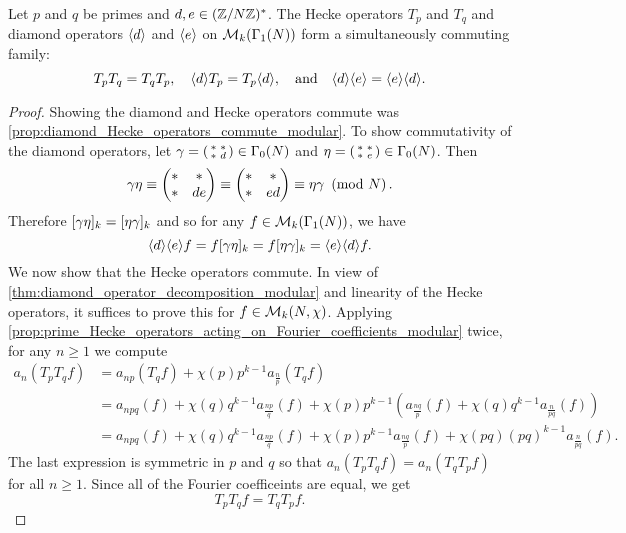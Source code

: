       \begin{proposition}\label{prop:Hecke_operators_commute_modular}
        Let $p$ and $q$ be primes and $d,e \in (\mathbb{Z}/N\mathbb{Z})^{\ast}$. The Hecke operators $T_{p}$ and $T_{q}$ and diamond operators $\langle d\rangle$ and $\langle e\rangle$ on $\mathcal{M}_{k}(\Gamma_{1}(N))$ form a simultaneously commuting family:
        \[
          T_{p}T_{q} = T_{q}T_{p}, \quad \langle d\rangle T_{p} = T_{p}\langle d\rangle, \quad \text{and} \quad \langle d\rangle\langle e\rangle = \langle e\rangle\langle d\rangle.
        \]
      \end{proposition}
      \begin{proof}
        Showing the diamond and Hecke operators commute was \cref{prop:diamond_Hecke_operators_commute_modular}. To show commutativity of the diamond operators, let $\gamma = \begin{psmallmatrix} \ast & \ast \\ \ast & d \end{psmallmatrix} \in \Gamma_{0}(N)$  and $\eta = \begin{psmallmatrix} \ast & \ast \\ \ast & e \end{psmallmatrix} \in \Gamma_{0}(N)$. Then
        \[
          \gamma\eta \equiv \begin{pmatrix} \ast & \ast \\ \ast & de \end{pmatrix} \equiv \begin{pmatrix} \ast & \ast \\ \ast & ed \end{pmatrix} \equiv \eta\gamma \ \left(\text{mod }N\right).
        \]
        Therefore $[\gamma\eta]_{k} = [\eta\gamma]_{k}$ and so for any $f \in \mathcal{M}_{k}(\Gamma_{1}(N))$, we have
        \[
          \langle d\rangle\langle e\rangle f = f[\gamma\eta]_{k} = f[\eta\gamma]_{k} = \langle e\rangle\langle d\rangle f.
        \]
        We now show that the Hecke operators commute. In view of \cref{thm:diamond_operator_decomposition_modular} and linearity of the Hecke operators, it suffices to prove this for $f \in \mathcal{M}_{k}(N,\chi)$. Applying \cref{prop:prime_Hecke_operators_acting_on_Fourier_coefficients_modular} twice, for any $n \ge 1$ we compute
        \begin{align*}
          a_{n}(T_{p}T_{q}f) &= a_{np}(T_{q}f)+\chi(p)p^{k-1}a_{\frac{n}{p}}(T_{q}f) \\
          &= a_{npq}(f)+\chi(q)q^{k-1}a_{\frac{np}{q}}(f)+\chi(p)p^{k-1}(a_{\frac{nq}{p}}(f)+\chi(q)q^{k-1}a_{\frac{n}{pq}}(f)) \\
          &= a_{npq}(f)+\chi(q)q^{k-1}a_{\frac{np}{q}}(f)+\chi(p)p^{k-1}a_{\frac{nq}{p}}(f)+\chi(pq)(pq)^{k-1}a_{\frac{n}{pq}}(f).
        \end{align*}
        The last expression is symmetric in $p$ and $q$ so that $a_{n}(T_{p}T_{q}f) = a_{n}(T_{q}T_{p}f)$ for all $n \ge 1$. Since all of the Fourier coefficeints are equal, we get
        \[
          T_{p}T_{q}f = T_{q}T_{p}f.
        \]
      \end{proof}

